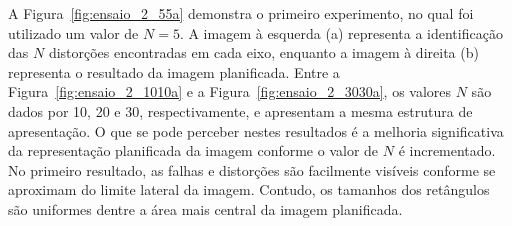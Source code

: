 A Figura~\ref{fig:ensaio_2_55a} demonstra o primeiro experimento, no qual
foi utilizado um valor de $N = 5$. A imagem à esquerda (a) representa a identificação das $N$ distorções encontradas em cada eixo, enquanto a imagem à direita (b) representa o resultado da imagem planificada. Entre a Figura~\ref{fig:ensaio_2_1010a} e a Figura~\ref{fig:ensaio_2_3030a}, os valores $N$ são dados por 10, 20 e 30, respectivamente, e apresentam a mesma estrutura de apresentação. O que se pode perceber nestes resultados é a melhoria significativa da representação planificada da imagem conforme o valor de $N$ é incrementado. No primeiro resultado, as falhas e distorções são facilmente visíveis conforme se aproximam do limite lateral da imagem. Contudo, os tamanhos dos retângulos são uniformes dentre a área mais central da imagem planificada. 

